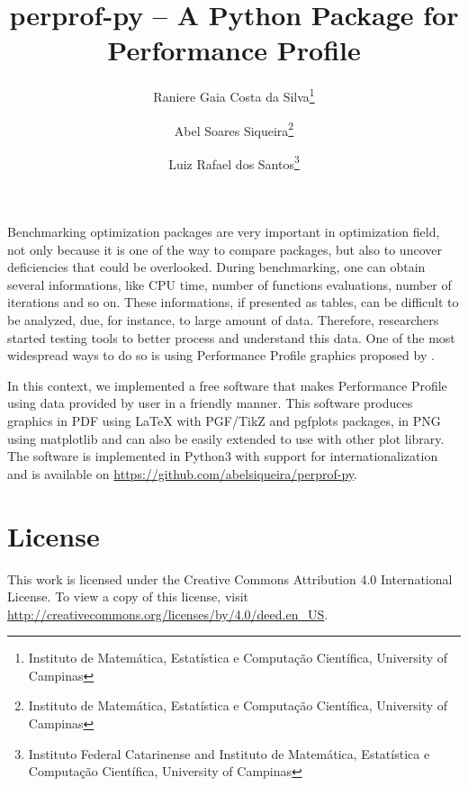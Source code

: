 \documentclass[12pt,a4paper]{article}
\begin{document}
\title{perprof-py -- A Python Package for Performance Profile}
\author{Raniere Gaia Costa da Silva\footnote{Instituto de Matemática,
Estatística e Computação Científica, University of Campinas}
\and
Abel Soares Siqueira\footnote{Instituto de Matemática,
Estatística e Computação Científica, University of Campinas}
\and
Luiz Rafael dos Santos\footnote{Instituto Federal Catarinense and Instituto de Matemática,
Estatística e Computação Científica, University of  Campinas}}
\date{}

\maketitle

Benchmarking optimization packages are very important in optimization field, not
only because it is one of the way to compare packages, but also to uncover
deficiencies that could be overlooked. During benchmarking, one can obtain
several informations, like CPU time, number of functions evaluations, number of
iterations and so on. These informations, if presented as tables, can be
difficult to be analyzed, due, for instance, to large amount of data. Therefore,
researchers started testing tools to better process and understand this data.
One of the most widespread ways to do so is using Performance Profile graphics
proposed by \citeauthor{Dolan2001}.

In this context, we implemented a free software that makes Performance Profile
using data provided by user in a friendly manner. This software produces
graphics in PDF using LaTeX with PGF/TikZ\nocite{TikZ} and
pgfplots\nocite{pgfplots} packages, in PNG using matplotlib\nocite{Hunter:2007}
and can also be easily extended to use with other plot library. The software is
implemented in Python3 with support for internationalization and is available on
\url{https://github.com/abelsiqueira/perprof-py}.

\printbibliography

\section*{License}
This work is licensed under the Creative Commons Attribution 4.0 International
License. To view a copy of this license, visit
\url{http://creativecommons.org/licenses/by/4.0/deed.en_US}.
\end{document}
